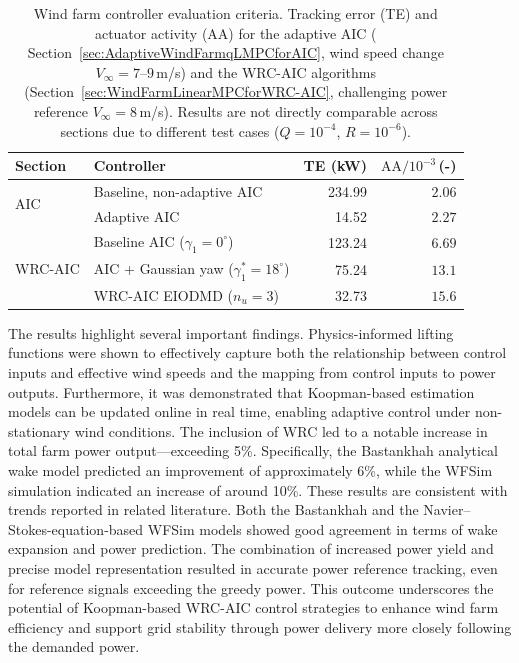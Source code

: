 \begin{table}[h]
    \centering
    \caption[Wind farm controller evaluation criteria: Tracking error and
    actuator activity for adaptive AIC (wind speed change) and AIC vs two WRC schemes (challenging power reference).]{Wind farm controller evaluation criteria.
        Tracking error (TE) and actuator activity (AA) for the adaptive AIC
        ( Section~\ref{sec:AdaptiveWindFarmqLMPCforAIC}, wind speed change $V_\infty = 7$--$9$\,m/s)
        and the WRC-AIC algorithms
        (Section~\ref{sec:WindFarmLinearMPCforWRC-AIC}, challenging power reference $V_\infty = 8$\,m/s).
        Results are not directly comparable across sections due to different
        test cases ($Q = 10^{-4}$, $R = 10^{-6}$).}
    \label{tab:WindFarmSummary}
    \begin{tabular}{ll rr}
        \toprule
        Section & Controller & TE (kW) & $\text{AA} / 10^{-3}$\,(-) \\
        \midrule
        \multirow{2}{*}{AIC}
        & Baseline, non-adaptive AIC  & 234.99 & $2.06$ \\
        & Adaptive AIC                &  14.52 & $2.27$ \\
        \midrule
        \multirow{3}{*}{WRC-AIC}
        & Baseline AIC ($\gamma_1 = 0^\circ$)              & 123.24 & $6.69$ \\
        & AIC + Gaussian yaw ($\gamma_1^* = 18^\circ$)     &  75.24 & $13.1$ \\
        & WRC-AIC EIODMD ($n_u = 3$)                       &  32.73 & $15.6$ \\
        \bottomrule
    \end{tabular}
\end{table}

The results highlight several important findings. Physics-informed lifting functions were shown
to effectively capture both the relationship between control inputs and effective wind speeds and
the mapping from control inputs to power outputs. Furthermore, it was demonstrated that
Koopman-based estimation models can be updated online in real time, enabling adaptive control
under non-stationary wind conditions. The inclusion of WRC led to a notable increase in total
farm power output---exceeding 5\%. Specifically, the Bastankhah analytical wake model predicted
an improvement of approximately 6\%, while the WFSim simulation indicated an increase of
around 10\%. These results are consistent with trends reported in related literature. Both the
Bastankhah and the Navier--Stokes-equation-based WFSim models showed good agreement in
terms of wake expansion and power prediction. The combination of increased power yield and
precise model representation resulted in accurate power reference tracking, even for reference
signals exceeding the greedy power. This outcome underscores the potential of Koopman-based
WRC-AIC control strategies to enhance wind farm efficiency and support grid stability through power delivery more closely following the demanded power.


